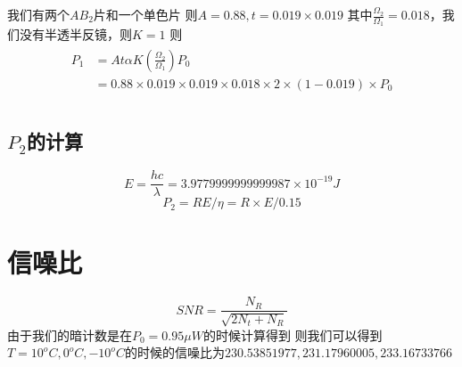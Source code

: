 \documentclass[10pt, a4paper,twocolumn]{article}
\begin{document}
	我们有两个$AB_2$片和一个单色片
	则$A=0.88,t=0.019\times0.019$
	其中$\frac{\Omega_2}{\Omega_1}=0.018$，我们没有半透半反镜，则$K=1$  
    则
    \begin{align}
    	\begin{split}
    		P_1 & = At\alpha K(\frac{\Omega_2}{\Omega_1})P_0\\
    		    & =0.88\times0.019\times0.019\times0.018\times2\times(1-0.019)\times P_0\\
    	\end{split}
    \end{align}
    \subsection{$P_2$的计算}
    \begin{equation}
    	E = \frac{hc}{\lambda} = 3.9779999999999987\times10^{-19}J
    \end{equation}
    \begin{equation}
    	P_2 = RE/\eta = R\times E /0.15 
    \end{equation}
    
    \section{信噪比}

    \begin{equation}
    	SNR = \frac{N_R}{\sqrt{2N_t+N_R}}
    \end{equation}
    由于我们的暗计数是在$P_0 = 0.95\mu W$的时候计算得到
    则我们可以得到$T = 10^oC,0^oC,-10^oC$的时候的信噪比为$230.53851977,231.17960005,233.16733766$
\end{document}
